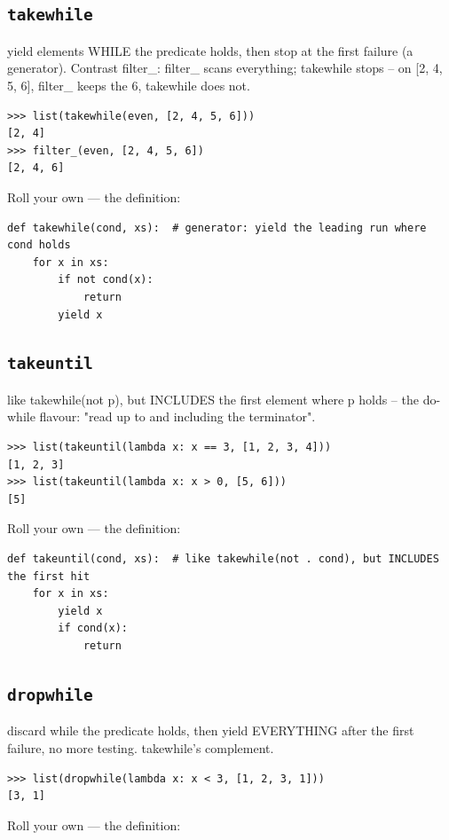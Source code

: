 \documentclass[10pt,letterpaper]{book}
\begin{document}
\subsection{\texttt{takewhile}}\label{def:takewhile}
yield elements WHILE the predicate holds, then stop at the first failure (a generator). Contrast filter\_: filter\_ scans everything; takewhile stops -- on [2, 4, 5, 6], filter\_ keeps the 6, takewhile does not.
\begin{lstlisting}[style=ex]
>>> list(takewhile(even, [2, 4, 5, 6]))
[2, 4]
>>> filter_(even, [2, 4, 5, 6])
[2, 4, 6]
\end{lstlisting}

Roll your own --- the definition:

\begin{lstlisting}[style=ex]
def takewhile(cond, xs):  # generator: yield the leading run where cond holds
    for x in xs:
        if not cond(x):
            return
        yield x
\end{lstlisting}
\subsection{\texttt{takeuntil}}\label{def:takeuntil}
like takewhile(not p), but INCLUDES the first element where p holds -- the do-while flavour: "read up to and including the terminator".
\begin{lstlisting}[style=ex]
>>> list(takeuntil(lambda x: x == 3, [1, 2, 3, 4]))
[1, 2, 3]
>>> list(takeuntil(lambda x: x > 0, [5, 6]))
[5]
\end{lstlisting}

Roll your own --- the definition:

\begin{lstlisting}[style=ex]
def takeuntil(cond, xs):  # like takewhile(not . cond), but INCLUDES the first hit
    for x in xs:
        yield x
        if cond(x):
            return
\end{lstlisting}
\subsection{\texttt{dropwhile}}\label{def:dropwhile}
discard while the predicate holds, then yield EVERYTHING after the first failure, no more testing. takewhile's complement.
\begin{lstlisting}[style=ex]
>>> list(dropwhile(lambda x: x < 3, [1, 2, 3, 1]))
[3, 1]
\end{lstlisting}

Roll your own --- the definition:
\end{document}
